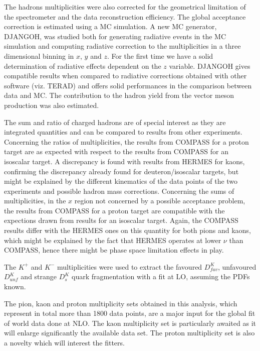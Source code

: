 The hadrons multiplicities were also corrected for the geometrical limitation of the spectrometer and the data reconstruction efficiency. The global acceptance correction is estimated using a MC simulation. A new MC generator, DJANGOH\cite{DJANGOH,DJANGOHnote}, was studied both for generating radiative events in the MC simulation and computing radiative correction to the multiplicities in a three dimensional binning in $x$, $y$ and $z$. For the first time we have a solid determination of radiative effects dependent on the $z$ variable. DJANGOH gives compatible results when compared to radiative corrections obtained with other software (viz. TERAD) and offers solid performances in the comparison between data and MC. The contribution to the hadron yield from the vector meson production was also estimated.

The sum and ratio of charged hadrons are of special interest as they are integrated quantities and can be compared to results from other experiments. Concerning the ratios of multiplicities, the results from COMPASS for a proton target are as expected with respect to the results from COMPASS for an isoscalar target\cite{COMPASS2006Pi,COMPASS2006K}. A discrepancy is found with results from HERMES\cite{HERMESMult} for kaons, confirming the discrepancy already found for deuteron/isoscalar targets, but might be explained by the different kinematics of the data points of the two experiments and possible hadron mass corrections\cite{Accardi}. Concerning the sums of multiplicities, in the $x$ region not concerned by a possible acceptance problem, the results from COMPASS for a proton target are compatible with the expections drawn from results for an isoscalar target. Again, the COMPASS results differ with the HERMES ones on this quantity for both pions and kaons, which might be explained by the fact that HERMES operates at lower $\nu$ than COMPASS, hence there might be phase space limitation effects in play\cite{MarcinPubli}.

The $K^+$ and $K^-$ multiplicities were used to extract the favoured $D^{K}_{fav}$, unfavoured $D^{K}_{unf}$ and strange $D^{K}_{s}$ quark fragmentation with a fit at LO, assuming the PDFs known.

The pion, kaon and proton multiplicity sets obtained in this analysis, which represent in total more than 1800 data points, are a major input for the global fit of world data done at NLO. The kaon multiplicity set is particularly awaited as it will enlarge significantly the available data set\cite{DIS2019}. The proton multiplicity set is also a novelty which will interest the fitters.
